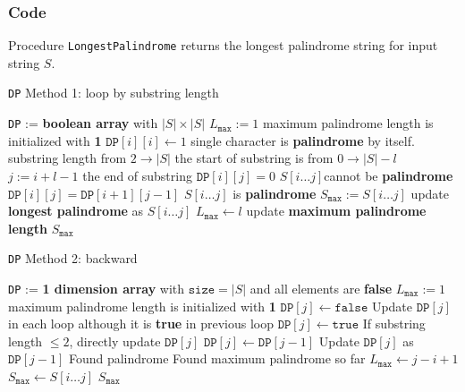 \documentclass[a4paper,12pt]{article}
\begin{document}
\subsubsection{Code}
Procedure \texttt{LongestPalindrome} returns the longest palindrome string for input string $S$.
\setcounter{algorithm}{0}
\begin{algorithm}[H]
\caption{\texttt{DP} Method 1: loop by substring length}
\begin{algorithmic}[1]
\State \texttt{DP} := \textbf{boolean array} with $|S|\times|S|$
\State $L_\mathtt{max} := 1$ \Comment maximum palindrome length is initialized with \textbf{1} 
\State $\mathtt{DP}[i][i] \gets 1$ \Comment single character is \textbf{palindrome} by itself.
\EndFor
{} \Comment substring length from $2 \to |S|$
 \Comment the start of substring is from $0 \to |S| - l$
\State $j := i + l - 1$ \Comment the end of substring
\State $\mathtt{DP}[i][j] = 0$ \Comment $S[i\ldots j] $cannot be \textbf{palindrome}
\Else
\State $\mathtt{DP}[i][j] = \mathtt{DP}[i+1][j-1]$ 
\EndIf
{} \Comment $S[i\ldots j]$ is \textbf{palindrome}
\State $S_\mathtt{max} := S[i\ldots j]$ \Comment update \textbf{longest palindrome} as $S[i\ldots j]$
\State $L_\mathtt{max} \gets l$ \Comment update \textbf{maximum palindrome length}
\EndIf
\EndIf
\EndFor
\EndFor
\State \Return $S_\mathtt{max}$
\EndProcedure
\end{algorithmic}
\end{algorithm}

\begin{algorithm}[H]
\caption{\texttt{DP} Method 2: backward}
\begin{algorithmic}[1]
\State \texttt{DP} := \textbf{1 dimension array} with $\mathtt{size} = |S|$ and all elements are \textbf{false}
\State $L_\mathtt{max} := 1$ \Comment maximum palindrome length is initialized with \textbf{1} 
\State $\mathtt{DP}[j] \gets \mathtt{false}$ \Comment Update $\mathtt{DP}[j]$ in each loop although it is \textbf{true} in previous loop
\Else
{}
\State $\mathtt{DP}[j] \gets \mathtt{true}$ \Comment If substring length $\leq 2$, directly update $\mathtt{DP}[j]$
\Else 
\State $\mathtt{DP}[j] \gets \mathtt{DP}[j-1]$ \Comment  Update $\mathtt{DP}[j]$ as $\mathtt{DP}[j-1]$ 
\EndIf
\EndIf
{} \Comment Found palindrome
 \Comment Found maximum palindrome so far
\State $L_\mathtt{max} \gets j-i +1$
\State $S_\mathtt{max} \gets S[i\ldots j]$
\EndIf
\EndIf
\EndFor
\EndFor
\State \Return $S_\mathtt{max}$
\EndProcedure
\end{algorithmic}
\end{algorithm}
\end{document}
